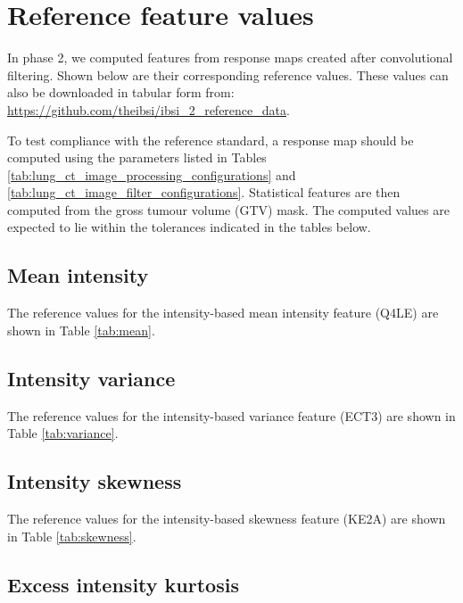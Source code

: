 \documentclass[fleqn,a4paper,oneside,openany]{book}
\newcommand\textid[1]{{\normalsize{\idfont #1}}}
\begin{document}
\section{Reference feature values}

In phase 2, we computed features from response maps created after convolutional filtering. Shown below are their corresponding reference values. These values can also be downloaded in tabular form from: \url{https://github.com/theibsi/ibsi_2_reference_data}.

To test compliance with the reference standard, a response map should be computed using the parameters listed in Tables \ref{tab:lung_ct_image_processing_configurations} and \ref{tab:lung_ct_image_filter_configurations}. Statistical features are then computed from the gross tumour volume (GTV) mask. The computed values are expected to lie within the tolerances indicated in the tables below.

\subsection{Mean intensity}

The reference values for the intensity-based mean intensity feature (\textid{Q4LE}) are shown in Table \ref{tab:mean}.

\subsection{Intensity variance}

The reference values for the intensity-based variance feature (\textid{ECT3}) are shown in Table \ref{tab:variance}.

\begin{minipage}[l]{0.45\textwidth}

\end{minipage}
\quad
\begin{minipage}[r]{0.45\textwidth}

\end{minipage}
\FloatBarrier

\subsection{Intensity skewness}

The reference values for the intensity-based skewness feature (\textid{KE2A}) are shown in Table \ref{tab:skewness}.

\subsection{Excess intensity kurtosis}
\end{document}
